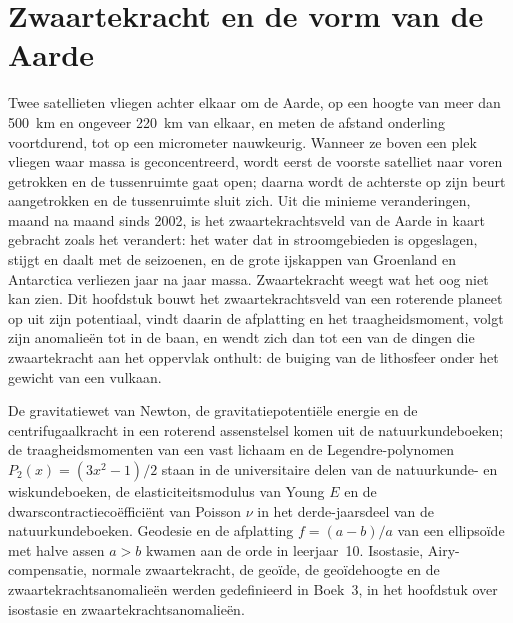 \chapter{Zwaartekracht en de vorm van de Aarde}\label{ch:b3:gravity-geodesy}

Twee satellieten vliegen achter elkaar om de Aarde, op een hoogte van meer
dan \qty{500}{km} en ongeveer \qty{220}{km} van elkaar, en meten de afstand
onderling voortdurend, tot op een micrometer nauwkeurig.
Wanneer ze boven een plek vliegen waar massa is geconcentreerd, wordt eerst de voorste satelliet
naar voren getrokken en de tussenruimte gaat open; daarna wordt de achterste op zijn beurt
aangetrokken en de tussenruimte sluit zich. Uit die minieme veranderingen, maand na maand sinds 2002,
is het zwaartekrachtsveld van de Aarde in kaart gebracht zoals het verandert: het water dat
in stroomgebieden is opgeslagen, stijgt en daalt met de seizoenen, en de grote ijskappen van
Groenland en Antarctica verliezen jaar na jaar massa. Zwaartekracht weegt wat het oog
niet kan zien. Dit hoofdstuk bouwt het zwaartekrachtsveld van een roterende planeet op uit
zijn potentiaal, vindt daarin de afplatting en het traagheidsmoment, volgt zijn
anomalieën tot in de baan, en wendt zich dan tot een van de dingen die zwaartekracht
aan het oppervlak onthult: de buiging van de lithosfeer onder het gewicht van een vulkaan.

\begin{recall}
De gravitatiewet van Newton, de gravitatiepotentiële energie en de
centrifugaalkracht in een roterend assenstelsel komen uit de natuurkundeboeken; de traagheidsmomenten van
een vast lichaam en de Legendre-polynomen $P_2(x) = (3x^2 - 1)/2$ staan in
de universitaire delen van de natuurkunde- en wiskundeboeken, de elasticiteitsmodulus van Young $E$ en
de dwarscontractiecoëfficiënt van Poisson $\nu$ in het derde-jaarsdeel van de natuurkundeboeken. Geodesie en de
afplatting $f = (a - b)/a$ van een ellipsoïde met halve assen $a > b$ kwamen aan de orde in
leerjaar~10. Isostasie, Airy-compensatie, normale zwaartekracht, de geoïde, de geoïdehoogte
en de zwaartekrachtsanomalieën werden gedefinieerd in Boek~3, in het hoofdstuk
over isostasie en zwaartekrachtsanomalieën.
\end{recall}

